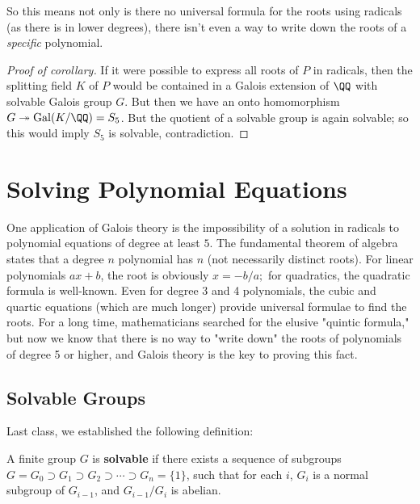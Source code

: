 So this means not only is there no universal formula for the roots using radicals (as there is in lower degrees), there isn't even a way to write down the roots of a \emph{specific} polynomial. 

\begin{proof}[Proof of corollary]
If it were possible to express all roots of $P$ in radicals, then the splitting field $K$ of $P$ would be contained in a Galois extension of $\QQ$ with solvable Galois group $G$. But then we have an onto homomorphism $G \twoheadrightarrow \operatorname{Gal}(K/\QQ) = S_5$. But the quotient of a solvable group is again solvable; so this would imply $S_5$ is solvable, contradiction. 
\end{proof}





\section{Solving Polynomial Equations}

One application of Galois theory is the impossibility of a solution in radicals to polynomial equations of degree at least $5$. The fundamental theorem of algebra states that a degree $n$ polynomial has $n$ (not necessarily distinct roots). For linear polynomials $ax + b$, the root is obviously $x = -b/a;$ for quadratics, the quadratic formula is well-known. Even for degree 3 and 4 polynomials, the cubic and quartic equations (which are much longer) provide universal formulae to find the roots. For a long time, mathematicians searched for the elusive "quintic formula," but now we know that there is no way to "write down" the roots of polynomials of degree 5 or higher, and Galois theory is the key to proving this fact.

\subsection{Solvable Groups}

Last class, we established the following definition:

\begin{definition}
    A finite group $G$ is \textbf{solvable} if there exists a sequence of subgroups $G = G_0 \supset G_1 \supset G_2 \supset \cdots \supset G_n = \{1\}$, such that for each $i$, $G_i$ is a normal subgroup of $G_{i - 1}$, and $G_{i - 1}/G_i$ is abelian. 
\end{definition}

